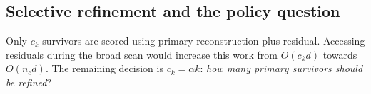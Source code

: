 \subsection{Selective refinement and the policy question}
Only $c_k$ survivors are scored using primary reconstruction plus residual.
Accessing residuals during the broad scan would increase this work from
$O(c_kd)$ towards $O(n_cd)$. The remaining decision is $c_k=\alpha k$:
\emph{how many primary survivors should be refined}?
